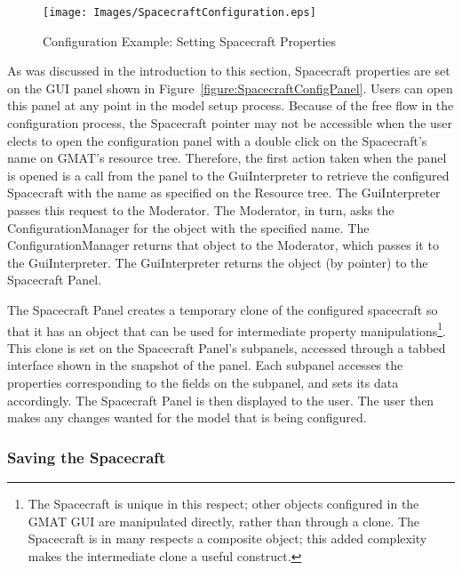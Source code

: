 \begin{figure}[htb]
\begin{center}
\texttt{[image: Images/SpacecraftConfiguration.eps]}
\caption{\label{figure:ConfiguringResource}Configuration Example: Setting Spacecraft Properties}
\end{center}
\end{figure}

As was discussed in the introduction to this section, Spacecraft properties are set on the GUI panel
shown in Figure~\ref{figure:SpacecraftConfigPanel}.  Users can open this panel at any point in the
model setup process.  Because of the free flow in the configuration process, the Spacecraft pointer
may not be accessible when the user elects to open the configuration panel with a double click on
the Spacecraft's name on GMAT's resource tree.  Therefore, the first action taken when the panel is
opened is a call from the panel to the GuiInterpreter to retrieve the configured Spacecraft with the
name as specified on the Resource tree.  The GuiInterpreter passes this request to the Moderator.
The Moderator, in turn, asks the ConfigurationManager for the object with the specified name.  The
ConfigurationManager returns that object to the Moderator, which passes it to the GuiInterpreter.
The GuiInterpreter returns the object (by pointer) to the Spacecraft Panel.

The Spacecraft Panel creates a temporary clone of the configured spacecraft so that it has an object
that can be used for intermediate property manipulations\footnote{The Spacecraft is unique in this
respect; other objects configured in the GMAT GUI are manipulated directly, rather than through a
clone.  The Spacecraft is in many respects a composite object; this added complexity makes the
intermediate clone a useful construct.}.  This clone is set on the Spacecraft Panel's subpanels,
accessed through a tabbed interface shown in the snapshot of the panel.  Each subpanel accesses the
properties corresponding to the fields on the subpanel, and sets its data accordingly. The
Spacecraft Panel is then displayed to the user.  The user then makes any changes wanted for the
model that is being configured.

\subsubsection{\label{section:ObjectPersistance}Saving the Spacecraft}

